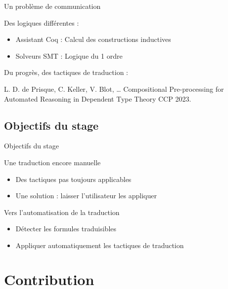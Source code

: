 \documentclass[french,usepdftitle=false,compress]{beamer}
\begin{document}
\begin{frame}{Un problème de communication}
  \begin{alertblock}{Des logiques différentes :}
    \begin{itemize}
      \item Assistant Coq : Calcul des constructions inductives
      \item Solveurs SMT : Logique du 1\ier{} ordre
    \end{itemize}
  \end{alertblock}

  \begin{exampleblock}{Du progrès, des tactiques de traduction :}
    \begin{thebibliography}{10}
      \beamertemplatearticlebibitems
      L. D. de Prisque, C. Keller, V. Blot, \dots
      \newblock Compositional Pre-processing for Automated Reasoning in Dependent Type Theory
      \newblock CCP 2023.
    \end{thebibliography}
  \end{exampleblock}
\end{frame}

\subsection{Objectifs du stage}
\begin{frame}{Objectifs du stage}
  \begin{block}{Une traduction encore manuelle}
    \begin{itemize}
      \item Des tactiques pas toujours applicables
      \item Une solution : laisser l'utilisateur les appliquer
    \end{itemize}
  \end{block}

  \begin{exampleblock}{Vers l'automatisation de la traduction}
    \begin{itemize}
      \item Détecter les formules traduisibles
      \item Appliquer automatiquement les tactiques de traduction
    \end{itemize}
  \end{exampleblock}
\end{frame}

\section{Contribution}
\end{document}
